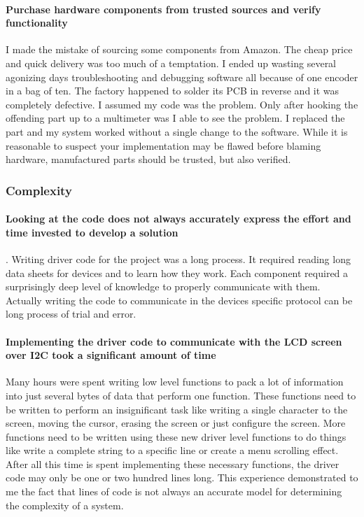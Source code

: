 \documentclass[acmlarge,screen]{acmart}
\begin{document}
	\paragraph{Purchase hardware components from trusted sources and verify functionality} I made the mistake of sourcing some components from Amazon. The cheap price and quick delivery was too much of a temptation. I ended up wasting several agonizing days troubleshooting and debugging software all because of one encoder in a bag of ten. The factory happened to solder its PCB in reverse and it was completely defective. I assumed my code was the problem. Only after hooking the offending part up to a multimeter was I able to see the problem. I replaced the part and my system worked without a single change to the software. While it is reasonable to suspect your implementation may be flawed before blaming hardware, manufactured parts should be trusted, but also verified.
	
	\subsubsection{Complexity}
	\paragraph{Looking at the code does not always accurately express the effort and time invested to develop a solution}. Writing driver code for the project was a long process. It required reading long data sheets for devices and to learn how they work. Each component required a surprisingly deep level of knowledge to properly communicate with them. Actually writing the code to communicate in the devices specific protocol can be long process of trial and error. 
	
	\paragraph{Implementing the driver code to communicate with the LCD screen over I2C took a significant amount of time} Many hours were spent writing low level functions to pack a lot of information into just several bytes of data that perform one function. These functions need to be written to perform an insignificant task like writing a single character to the screen, moving the cursor, erasing the screen or just configure the screen. More functions need to be written using these new driver level functions to do things like write a complete string to a specific line or create a menu scrolling effect. After all this time is spent implementing these necessary functions, the driver code may only be one or two hundred lines long. This experience demonstrated to me the fact that lines of code is not always an accurate model for determining the complexity of a system.
	
\end{document}
